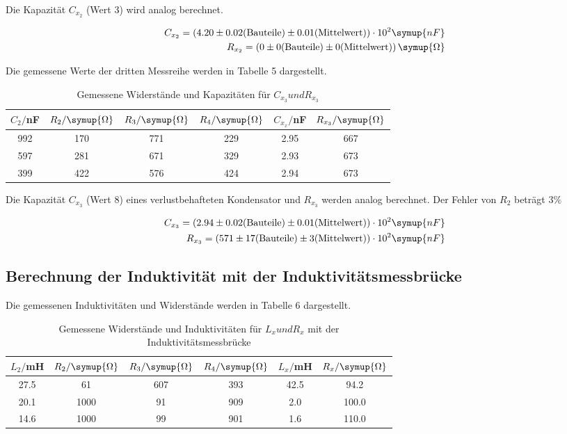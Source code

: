 Die Kapazität $C_{x_2}$ (Wert 3) wird analog berechnet.

\begin{align*}
  C_{x_2} = (4.20 \pm 0.02 \text{(Bauteile)} \pm 0.01 \text{(Mittelwert)}) \cdot 10^{2} \symup{nF} \\
  R_{x_2} = (0 \pm 0 \text{(Bauteile)} \pm 0 \text{(Mittelwert)}) \, \symup{\Omega}
\end{align*}


Die gemessene Werte der dritten Messreihe werden in Tabelle 5 dargestellt.

\begin{table}[H]
  \centering
  \caption{Gemessene Widerstände und Kapazitäten für $C_{x_3} und R_{x_3}$}
  \label{tab:Widerstand}
  \begin{tabular}{c c c c c c}
    \toprule
    $C_2/$nF & $R_2/ \symup{\Omega}$ & $R_3/ \symup{\Omega}$ & $R_4 / \symup{\Omega}$ & $C_{x_x}/$nF & $R_{x_3}/ \symup{\Omega}$  \\
    \midrule
    992 & 170 & 771 & 229 &  2.95 & 667  \\
    597 & 281 & 671 & 329 &  2.93 & 673  \\
    399 & 422 & 576 & 424 &  2.94 & 673  \\
    \bottomrule
  \end{tabular}
\end{table}

Die Kapazität $C_{x_3}$ (Wert 8) eines verlustbehafteten Kondensator und $R_{x_3}$ werden analog berechnet.
Der Fehler von $R_2$ beträgt $3\%$

\begin{align*}
  C_{x_3} = (2.94 \pm 0.02 \text{(Bauteile)} \pm 0.01 \text{(Mittelwert)}) \cdot 10^{2} \symup{nF} \\
  R_{x_3} = (571 \pm 17 \text{(Bauteile)} \pm 3\text{(Mittelwert)}) \cdot 10^{2} \symup{nF}
\end{align*}



\subsection{Berechnung der Induktivität mit der Induktivitätsmessbrücke}

Die gemessenen Induktivitäten und Widerstände werden in Tabelle 6 dargestellt.

\begin{table}[H]
  \centering
  \caption{Gemessene Widerstände und Induktivitäten für $L_{x} und R_{x}$ mit der Induktivitätsmessbrücke}
  \label{tab:Widerstand}
  \begin{tabular}{c c c c c c}
    \toprule
    $L_2/$mH & $R_2/ \symup{\Omega}$ & $R_3/ \symup{\Omega}$ & $R_4 / \symup{\Omega}$ & $L_x/$mH & $R_x / \symup{\Omega}$  \\
    \midrule
    27.5 &   61 & 607 & 393 & 42.5   & 94.2 \\
    20.1 & 1000 &  91 & 909 &  2.0   & 100.0\\
    14.6 & 1000 &  99 & 901 &  1.6   & 110.0\\
    \bottomrule
  \end{tabular}
\end{table}



